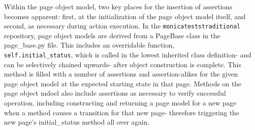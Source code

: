 Within the page object model, two key places for the insertion of assertions becomes apparent: first, at the initialization of the page object model itself, and second, as necessary during action execution. In the \texttt{monica\-tests\-traditional} repository, page object models are derived from a PageBase class in the page\_base.py file. This includes an overridable function, \\\texttt{self.initial\_status}, which is called in the lowest inherited class definition- and can be selectively chained upwards- after object construction is complete. This method is filled with a number of assertions and assertion-alikes for the given page object model at the expected starting state in that page. Methods on the page object mdoel also include assertions as necessary to verify successful operation, including constructing and returning a page model for a new page when a method causes a transition for that new page- therefore triggering the new page's initial\_status method all over again.
